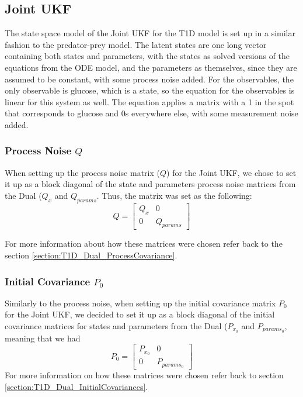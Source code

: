 \documentclass{article}
\begin{document}
\subsection{Joint UKF}

The state space model of the Joint UKF for the T1D model is set up in a similar fashion to the predator-prey model. The latent states are one long vector containing both states and parameters, with the states as solved versions of the equations from the ODE model, and the parameters as themselves, since they are assumed to be constant, with some process noise added. For the observables, the only observable is glucose, which is a state, so the equation for the observables is linear for this system as well. The equation applies a matrix with a 1 in the spot that corresponds to glucose and 0s everywhere else, with some measurement noise added. 

\subsubsection{Process Noise $Q$}
When setting up the process noise matrix ($Q$) for the Joint UKF, we chose to set it up as a block diagonal of the state and parameters process noise matrices from the Dual ($Q_x$ and $Q_{params}$. Thus, the matrix was set as the following:\\
\begin{equation}
Q = \begin{bmatrix} Q_x & 0 \\ 0 & Q_{params} \end{bmatrix}
\end{equation}

For more information about how these matrices were chosen refer back to the section \ref{section:T1D_Dual_ProcessCovariance}.

\subsubsection{Initial Covariance $P_0$}
Similarly to the process noise, when setting up the initial covariance matrix $P_0$ for the Joint UKF, we decided to set it up as a block diagonal of the initial covariance matrices for states and parameters from the Dual ($P_{x_0}$ and $P_{params_0}$, meaning that we had\\
\begin{equation}
P_0 = \begin{bmatrix} P_{x_0} & 0 \\ 0 & P_{params_0} \end{bmatrix}
\end{equation}
For more information on how these matrices were chosen refer back to section \ref{section:T1D_Dual_InitialCovariances}. 
\end{document}
